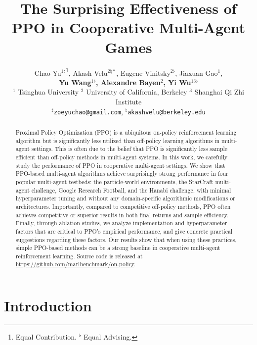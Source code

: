 \documentclass{article}
\title{The Surprising Effectiveness of PPO in Cooperative Multi-Agent Games}
\author{Chao Yu$^{1\sharp}$\thanks{Equal Contribution. $^{\flat}$ Equal Advising. }, 
Akash Velu$^{2\natural*}$, 
Eugene Vinitsky$^{2\flat}$, 
Jiaxuan Gao$^{1}$, \\
\textbf{
Yu Wang$^{1\flat}$, 
Alexandre Bayen$^{2}$,  
Yi Wu$^{13\flat}$}
\\
$^1$ Tsinghua University $^2$ University of California, Berkeley $^3$ Shanghai Qi Zhi Institute\\
$^{\sharp}$\texttt{zoeyuchao@gmail.com}, $^{\natural}$\texttt{akashvelu@berkeley.edu} \\
}
\theoremstyle{plain}
\theoremstyle{definition}
\theoremstyle{remark}
\begin{document}
\maketitle

\vspace{-4mm}
\begin{abstract}
Proximal Policy Optimization (PPO) is a ubiquitous on-policy reinforcement learning algorithm but is significantly less utilized than off-policy learning algorithms in multi-agent settings. This is often due to the belief that PPO is significantly less sample efficient than off-policy methods in multi-agent systems. In this work, we carefully study the performance of PPO in cooperative multi-agent settings. We show that PPO-based multi-agent algorithms achieve surprisingly strong performance in four popular multi-agent testbeds: the particle-world environments, the StarCraft multi-agent challenge, Google Research Football, and the Hanabi challenge, with minimal hyperparameter tuning and without any domain-specific algorithmic modifications or architectures. Importantly, compared to competitive off-policy methods, PPO often achieves competitive or superior results in both final returns and sample efficiency. Finally, through ablation studies, we analyze implementation and hyperparameter factors that are critical to PPO's empirical performance, and give concrete practical suggestions regarding these factors. Our results show that when using these practices, simple PPO-based methods can be a strong baseline in cooperative multi-agent reinforcement learning. Source code is released at \url{https://github.com/marlbenchmark/on-policy}.
\end{abstract}

\vspace{-4mm}
\section{Introduction}
\vspace{-3mm}
\end{document}
